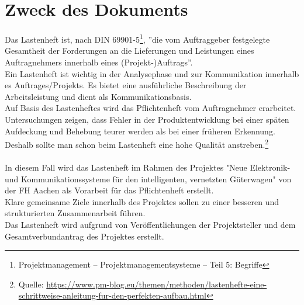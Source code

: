 \section*{Zweck des Dokuments}
Das Lastenheft ist, nach DIN 69901-5\footnote{Projektmanagement – Projektmanagementsysteme – 	Teil 5: Begriffe}, ''die vom Auftraggeber festgelegte Gesamtheit der Forderungen an die Lieferungen und Leistungen eines Auftragnehmers innerhalb eines (Projekt-)Auftrags''.\\
Ein Lastenheft ist wichtig in der Analysephase und zur Kommunikation innerhalb es Auftrages/Projekts. Es bietet eine ausführliche Beschreibung der Arbeitsleistung und dient als Kommunikationsbasis.\\
Auf Basis des Lastenheftes wird das Pflichtenheft vom Auftragnehmer erarbeitet.\\
Untersuchungen zeigen, dass Fehler in der Produktentwicklung bei einer späten Aufdeckung und Behebung teurer werden als bei einer früheren Erkennung. Deshalb sollte man schon beim Lastenheft eine hohe Qualität anstreben.\footnote{Quelle: \url{https://www.pm-blog.eu/themen/methoden/lastenhefte-eine-schrittweise-anleitung-fur-den-perfekten-aufbau.html} }
\\\\
In diesem Fall wird das Lastenheft im Rahmen des Projektes "Neue Elektronik- und Kommunikationssysteme für den intelligenten, vernetzten Güterwagen" von der FH Aachen als Vorarbeit für das Pflichtenheft erstellt. \\
Klare gemeinsame Ziele innerhalb des Projektes sollen zu einer besseren und strukturierten Zusammenarbeit führen.\\
Das Lastenheft wird aufgrund von Veröffentlichungen der Projektsteller und dem Gesamtverbundantrag des Projektes erstellt.
